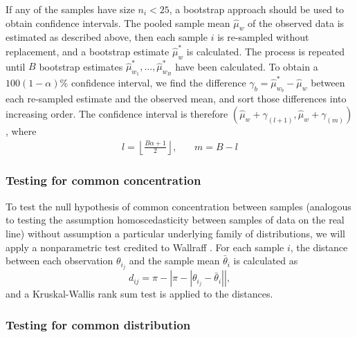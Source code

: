 \documentclass[../../ArchStats.tex]{subfiles}
\begin{document}
If any of the samples have size $n_i < 25$, a bootstrap approach should be used to obtain confidence intervals. The pooled sample mean $\hat{\mu}_w$ of the observed data is estimated as described above, then each sample $i$ is re-sampled without replacement, and a bootstrap estimate $\hat{\mu}^*_w$ is calculated. The process is repeated until $B$ bootstrap estimates $\hat{\mu}^*_{w_1}, \dots, \hat{\mu}^*_{w_B}$ have been calculated. To obtain a $100(1-\alpha)$\% confidence interval, we find the difference $\gamma_b = \hat{\mu}^*_{w_b} - \hat{\mu}_w$ between each re-sampled estimate and the observed mean, and sort those differences into increasing order. The confidence interval is therefore $(\hat{\mu}_w + \gamma_{(l+1)}, \hat{\mu}_w + \gamma_{(m)})$, where
\[\begin{matrix*}
l = \left\lfloor \frac{B\alpha + 1}{2} \right\rfloor, & \, & m = B-l
\end{matrix*} \]

\subsubsection{Testing for common concentration}
\label{sec:common-concentration}

To test the null hypothesis of common concentration between samples (analogous to testing the assumption homoscedasticity between samples of data on the real line) without assumption a particular underlying family of distributions, we will apply a nonparametric test credited to Wallraff \cite{Wallraff1979}. For each sample $i$, the distance between each observation $\theta_{i_j}$ and the sample mean $\bar{\theta}_i$ is calculated as
\[d_{ij} = \pi - \left\vert \pi - \left\vert \theta_{i_j} - \bar{\theta}_i \right\vert \right\vert, \]
and a Kruskal-Wallis rank sum test is applied to the distances.


\subsubsection{Testing for common distribution}
\end{document}
